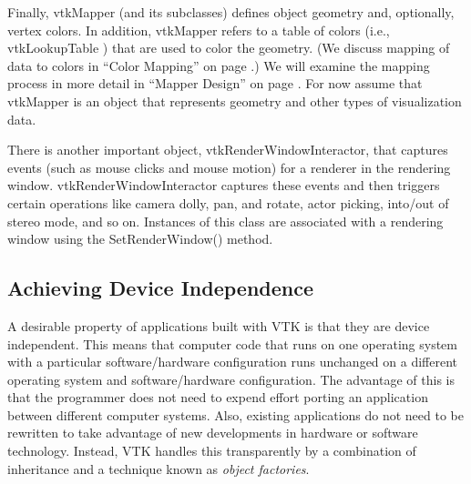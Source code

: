 Finally, vtkMapper (and its subclasses) defines object geometry and, optionally, vertex colors. In addition, vtkMapper refers to a table of colors (i.e., vtkLookupTable ) that are used to color the geometry. (We discuss mapping of data to colors in ``Color Mapping'' on page \pageref{subsec:color_mapping}.) We will examine the mapping process in more detail in ``Mapper Design'' on page \pageref{subsubsec:mapper_design}. For now assume that vtkMapper is an object that represents geometry and other types of visualization data.

There is another important object, vtkRenderWindowInteractor, that captures events (such as mouse clicks and mouse motion) for a renderer in the rendering window. vtkRenderWindowInteractor captures these events and then triggers certain operations like camera dolly, pan, and rotate, actor picking, into/out of stereo mode, and so on. Instances of this class are associated with a rendering window using the SetRenderWindow() method.

\subsection{Achieving Device Independence}
\label{sec:adi}

A desirable property of applications built with VTK is that they are device independent. This means that computer code that runs on one operating system with a particular software/hardware configuration runs unchanged on a different operating system and software/hardware configuration. The advantage of this is that the programmer does not need to expend effort porting an application between different computer systems. Also, existing applications do not need to be rewritten to take advantage of new developments in hardware or software technology. Instead, VTK handles this transparently by a combination of inheritance and a technique known as \emph{object factories}.


